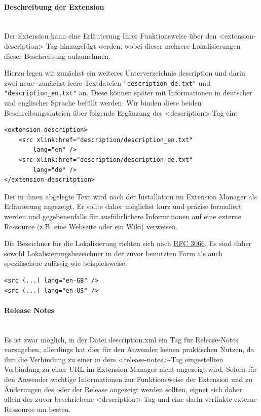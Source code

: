 \documentclass[a4paper,10pt,pagesize,titlepage]{scrbook}
\begin{document}
\paragraph*{Beschreibung der Extension}$~~$\\

Der Extension kann eine Erläuterung Ihrer Funktionsweise über den <extension-description>-Tag hinzugefügt werden, wobei dieser mehrere Lokalisierungen dieser Beschreibung aufzunehmen.

Hierzu legen wir zunächst ein weiteres Unterverzeichnis \glqq description \grqq und darin zwei neue -zunächst leere Textdateien \verb|"description_de.txt"| und \verb|"description_en.txt"| an. Diese können später mit Informationen in deutscher und englischer Sprache befüllt werden. Wir binden diese beiden Beschreibungsdateien über folgende Ergänzung des <description>-Tag ein:
\begin{lstlisting}
<extension-description>
    <src xlink:href="description/description_en.txt" 
        lang="en" />
    <src xlink:href="description/description_de.txt" 
        lang="de" />
</extension-descritption>
\end{lstlisting}

Der in ihnen abgelegte Text wird nach der Installation im Extension Manager als Erläuterung angezeigt. Er sollte daher möglichst kurz und präzise formuliert werden und gegebenenfalls für ausführlichere Informationen auf eine externe Ressource (z.B. eine Webseite oder ein Wiki) verweisen.

Die Bezeichner für die Lokalisierung richten sich nach \href{https://tools.ietf.org/html/rfc3066}{RFC 3066}. Es sind daher sowohl Lokalisierungsbezeichner in der zuvor benutzten Form als auch spezifischere zulässig wie beispielsweise:
\begin{lstlisting}
<src (...) lang="en-GB" />
<src (...) lang="en-US" />
\end{lstlisting}

\paragraph*{Release Notes}$~~$\\

Es ist zwar möglich, in der Datei description.xml ein Tag für Release-Notes vorzugeben, allerdings hat dies für den Anwender keinen praktischen Nutzen, da ihm die Verbindung zu einer in dem <release-notes>-Tag eingestellten Verbindung zu einer URL im Extension Manager nicht angezeigt wird. Sofern für den Anwender wichtige Informationen zur Funktionsweise der Extension und zu Änderungen des oder der Release angezeigt werden sollten, eignet sich daher allein der zuvor beschriebene <description>-Tag und eine darin verlinkte externe Ressource am besten.
\end{document}
